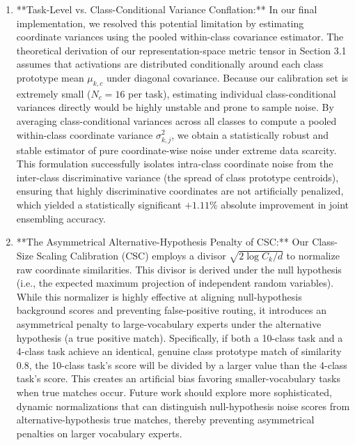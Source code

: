 \begin{enumerate}
    However, we must note that while a $48 \times 48$ covariance matrix can be stably regularized and decomposed, running a full online eigenvalue decomposition (EVD) during test-time is computationally expensive and does not scale well to higher-dimensional representations (e.g., $d \ge 1024$). To mitigate this latency bottleneck, future directions should explore low-rank covariance approximations or block-diagonal structures (such as Kronecker-Factored Approximate Curvature, or K-FAC) to capture coordinate correlations within small, highly correlated representation blocks. Alternatively, we can use the Woodbury matrix identity to perform low-cost, low-rank updates on the inverse covariance matrix, preserving the computational benefits of information-geometric routing in massive activation spaces.

    \item **Task-Level vs. Class-Conditional Variance Conflation:**
    In our final implementation, we resolved this potential limitation by estimating coordinate variances using the pooled within-class covariance estimator. The theoretical derivation of our representation-space metric tensor in Section 3.1 assumes that activations are distributed conditionally around each class prototype mean $\mu_{k, c}$ under diagonal covariance. Because our calibration set is extremely small ($N_c = 16$ per task), estimating individual class-conditional variances directly would be highly unstable and prone to sample noise. By averaging class-conditional variances across all classes to compute a pooled within-class coordinate variance $\sigma_{k, j}^2$, we obtain a statistically robust and stable estimator of pure coordinate-wise noise under extreme data scarcity. This formulation successfully isolates intra-class coordinate noise from the inter-class discriminative variance (the spread of class prototype centroids), ensuring that highly discriminative coordinates are not artificially penalized, which yielded a statistically significant $+1.11\%$ absolute improvement in joint ensembling accuracy.

    \item **The Asymmetrical Alternative-Hypothesis Penalty of CSC:**
    Our Class-Size Scaling Calibration (CSC) employs a divisor $\sqrt{2\log C_k / d}$ to normalize raw coordinate similarities. This divisor is derived under the null hypothesis (i.e., the expected maximum projection of independent random variables). While this normalizer is highly effective at aligning null-hypothesis background scores and preventing false-positive routing, it introduces an asymmetrical penalty to large-vocabulary experts under the alternative hypothesis (a true positive match). Specifically, if both a 10-class task and a 4-class task achieve an identical, genuine class prototype match of similarity $0.8$, the 10-class task's score will be divided by a larger value than the 4-class task's score. This creates an artificial bias favoring smaller-vocabulary tasks when true matches occur. Future work should explore more sophisticated, dynamic normalizations that can distinguish null-hypothesis noise scores from alternative-hypothesis true matches, thereby preventing asymmetrical penalties on larger vocabulary experts.


\end{enumerate}
